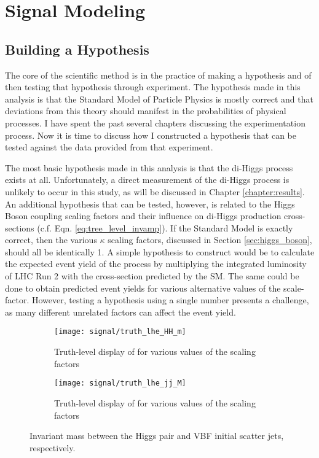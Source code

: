 \chapter{Signal Modeling} \label{chapter:signal}

\section{Building a Hypothesis}

    The core of the scientific method is in the practice of making a hypothesis
        and of then testing that hypothesis through experiment.
    The hypothesis made in this analysis is that the Standard Model of Particle Physics is mostly correct
        and that deviations from this theory should manifest in the probabilities of physical processes.
    I have spent the past several chapters discussing the experimentation process.
    Now it is time to discuss how I constructed a hypothesis that can be tested against the data provided from that experiment.

    The most basic hypothesis made in this analysis is that the di-Higgs process exists at all.
    Unfortunately, a direct measurement of the di-Higgs process is unlikely to occur in this study, as will be discussed in Chapter \ref{chapter:results}.
    An additional hypothesis that can be tested, however,
        is related to the Higgs Boson coupling scaling factors and their influence on di-Higgs production cross-sections
        (c.f. Eqn. \ref{eq:tree_level_invamp}).
    If the Standard Model is exactly correct, then the various $\kappa$ scaling factors,
        discussed in Section \ref{sec:higgs_boson},
        should all be identically 1.
    A simple hypothesis to construct would be to calculate the expected event yield of the \vbfproc process
        by multiplying the integrated luminosity of LHC Run 2 with the cross-section predicted by the SM.
    The same could be done to obtain predicted event yields for various alternative values of the scale-factor.
    However, testing a hypothesis using a single number presents a challenge, as many different unrelated factors can affect the event yield.


    \begin{figure}[tbh]
        \centering
        \begin{subfigure}{0.48\textwidth}
            \texttt{[image: signal/truth\_lhe\_HH\_m]}
            \captionsetup{justification=centering} \caption{Truth-level display of \mhh for various values of the scaling factors}
        \end{subfigure}
        \begin{subfigure}{0.48\textwidth}
            \texttt{[image: signal/truth\_lhe\_jj\_M]}
            \captionsetup{justification=centering} \caption{Truth-level display of \mjj for various values of the scaling factors}
        \end{subfigure}
        \caption{
            Invariant mass between the Higgs pair and VBF initial scatter jets, respectively.
        }
        \label{fig:lhe_truth1}
    \end{figure}

